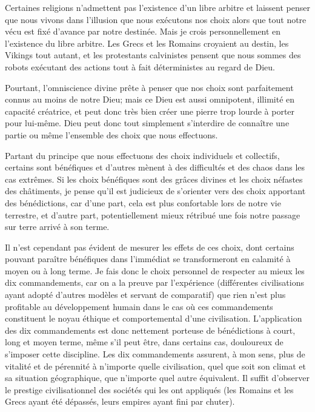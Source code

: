 Certaines religions n’admettent pas l’existence d’un libre arbitre et laissent penser que nous vivons dans l’illusion que nous exécutons nos choix alors que tout notre vécu est fixé d’avance par notre destinée. Mais je crois personnellement en l’existence du libre arbitre. Les Grecs et les Romains croyaient au destin, les Vikings tout autant, et les protestants calvinistes pensent que nous sommes des robots exécutant des actions tout à fait déterministes au regard de Dieu.

Pourtant, l’omniscience divine prête à penser que nos choix sont parfaitement connus au moins de notre Dieu; mais ce Dieu est aussi omnipotent, illimité en capacité créatrice, et peut donc très bien créer une pierre trop lourde à porter pour lui-même. Dieu peut donc tout simplement s’interdire de connaître une partie ou même l’ensemble des choix que nous effectuons.

Partant du principe que nous effectuons des choix individuels et collectifs, certains sont bénéfiques et d’autres mènent à des difficultés et des chaos dans les cas extrêmes. Si les choix bénéfiques sont des grâces divines et les choix néfastes des châtiments, je pense qu’il est judicieux de s’orienter vers des choix apportant des bénédictions, car d’une part, cela est plus confortable lors de notre vie terrestre, et d’autre part, potentiellement mieux rétribué une fois notre passage sur terre arrivé à son terme.

Il n’est cependant pas évident de mesurer les effets de ces choix, dont certains pouvant paraître bénéfiques dans l’immédiat se transformeront en calamité à moyen ou à long terme. Je fais donc le choix personnel de respecter au mieux les dix commandements, car on a la preuve par l’expérience (différentes civilisations ayant adopté d’autres modèles et servant de comparatif) que rien n’est plus profitable au développement humain dans le cas où ces commandements constituent le noyau éthique et comportemental d’une civilisation. L’application des dix commandements est donc nettement porteuse de bénédictions à court, long et moyen terme, même s’il peut être, dans certains cas, douloureux de s’imposer cette discipline. Les dix commandements assurent, à mon sens, plus de vitalité et de pérennité à n’importe quelle civilisation, quel que soit son climat et sa situation géographique, que n’importe quel autre équivalent. Il suffit d'observer le prestige civilisationnel des sociétés qui les ont appliqués (les Romains et les Grecs ayant été dépassés, leurs empires ayant fini par chuter).

